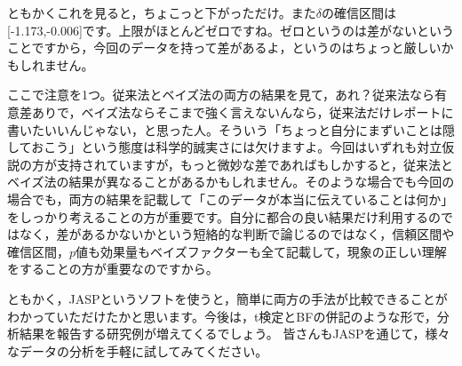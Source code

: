 \documentclass{ltjbook}
\begin{document}
ともかくこれを見ると，ちょこっと下がっただけ。また$\delta$の確信区間は[-1.173,-0.006]です。上限がほとんどゼロですね。ゼロというのは差がないということですから，今回のデータを持って差があるよ，というのはちょっと厳しいかもしれません。

ここで注意を1つ。従来法とベイズ法の両方の結果を見て，あれ？従来法なら有意差ありで，ベイズ法ならそこまで強く言えないんなら，従来法だけレポートに書いたいいんじゃない，と思った人。そういう「ちょっと自分にまずいことは隠しておこう」という態度は科学的誠実さには欠けますよ。今回はいずれも対立仮説の方が支持されていますが，もっと微妙な差であればもしかすると，従来法とベイズ法の結果が異なることがあるかもしれません。そのような場合でも今回の場合でも，両方の結果を記載して「このデータが本当に伝えていることは何か」をしっかり考えることの方が重要です。自分に都合の良い結果だけ利用するのではなく，差があるかないかという短絡的な判断で論じるのではなく，信頼区間や確信区間，$p$値も効果量もベイズファクターも全て記載して，現象の正しい理解をすることの方が重要なのですから。


ともかく，JASPというソフトを使うと，簡単に両方の手法が比較できることがわかっていただけたかと思います。今後は，t検定とBFの併記のような形で，分析結果を報告する研究例が増えてくるでしょう。
皆さんもJASPを通じて，様々なデータの分析を手軽に試してみてください。
\end{document}
